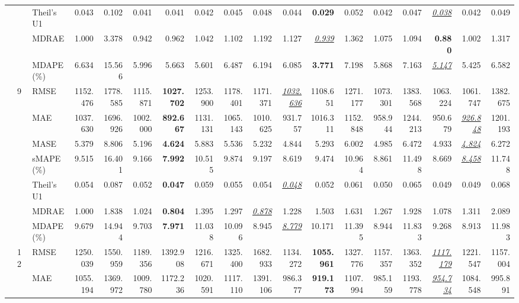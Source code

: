 \begin{table}[!htbp]
{\begin{tabular}{lllrrrrrrrrrrrrrrr}
 &  & Theil's U1 & 0.043 & 0.102 & 0.041 & 0.041 & 0.042 & 0.045 & 0.048 & 0.044 & \textbf{0.029} & 0.052 & 0.042 & 0.047 & \underline{\textit{0.038}} & 0.042 & 0.049 \\
 &  & MDRAE & 1.000 & 3.378 & 0.942 & 0.962 & 1.042 & 1.102 & 1.192 & 1.127 & \underline{\textit{0.939}} & 1.362 & 1.075 & 1.094 & \textbf{0.880} & 1.002 & 1.317 \\
 &  & MDAPE (\%) & 6.634 & 15.566 & 5.996 & 5.663 & 5.601 & 6.487 & 6.194 & 6.085 & \textbf{3.771} & 7.198 & 5.868 & 7.163 & \underline{\textit{5.147}} & 5.425 & 6.582 \\
\cmidrule(lr){2-18}
 & 9 & RMSE & 1152.476 & 1778.585 & 1115.871 & \textbf{1027.702} & 1253.900 & 1178.401 & 1171.371 & \underline{\textit{1032.636}} & 1108.651 & 1271.177 & 1073.301 & 1383.568 & 1063.224 & 1061.747 & 1382.675 \\
 &  & MAE & 1037.630 & 1696.926 & 1002.000 & \textbf{892.667} & 1131.131 & 1065.143 & 1010.625 & 931.757 & 1016.311 & 1152.848 & 958.944 & 1244.213 & 950.679 & \underline{\textit{926.848}} & 1201.193 \\
 &  & MASE & 5.379 & 8.806 & 5.196 & \textbf{4.624} & 5.883 & 5.536 & 5.232 & 4.844 & 5.293 & 6.002 & 4.985 & 6.472 & 4.933 & \underline{\textit{4.824}} & 6.272 \\
 &  & sMAPE (\%) & 9.515 & 16.401 & 9.166 & \textbf{7.992} & 10.515 & 9.874 & 9.197 & 8.619 & 9.474 & 10.964 & 8.861 & 11.498 & 8.669 & \underline{\textit{8.458}} & 11.748 \\
 &  & Theil's U1 & 0.054 & 0.087 & 0.052 & \textbf{0.047} & 0.059 & 0.055 & 0.054 & \underline{\textit{0.048}} & 0.052 & 0.061 & 0.050 & 0.065 & 0.049 & 0.049 & 0.068 \\
 &  & MDRAE & 1.000 & 1.838 & 1.024 & \textbf{0.804} & 1.395 & 1.297 & \underline{\textit{0.878}} & 1.228 & 1.503 & 1.631 & 1.267 & 1.928 & 1.078 & 1.311 & 2.089 \\
 &  & MDAPE (\%) & 9.679 & 14.944 & 9.703 & \textbf{7.971} & 11.038 & 10.096 & 8.945 & \underline{\textit{8.779}} & 10.171 & 11.395 & 8.944 & 11.833 & 9.268 & 8.913 & 11.983 \\
\cmidrule(lr){2-18}
 & 12 & RMSE & 1250.039 & 1550.959 & 1189.356 & 1392.908 & 1216.671 & 1325.400 & 1682.933 & 1134.272 & \textbf{1055.961} & 1327.776 & 1157.357 & 1363.352 & \underline{\textit{1117.179}} & 1221.547 & 1157.004 \\
 &  & MAE & 1055.194 & 1369.972 & 1009.780 & 1172.236 & 1020.591 & 1117.110 & 1391.106 & 986.377 & \textbf{919.173} & 1107.994 & 985.159 & 1193.778 & \underline{\textit{954.734}} & 1084.548 & 995.891 \\

\end{tabular}}
\end{table}

